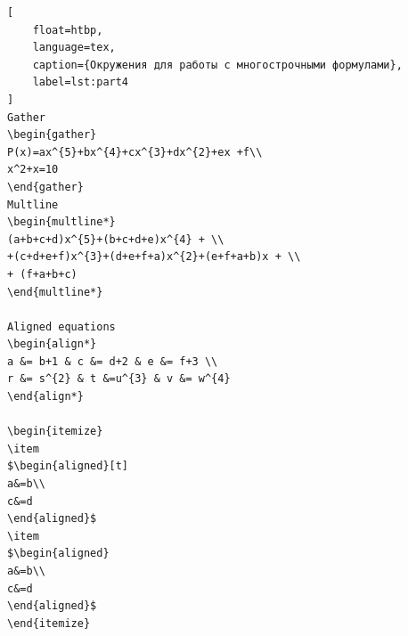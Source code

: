 \documentclass[a4paper, 12pt]{article}
\begin{document}
\begin{lstlisting}[
    float=htbp, 
    language=tex,
    caption={Окружения для работы с многострочными формулами}, 
    label=lst:part4
]
Gather
\begin{gather}
P(x)=ax^{5}+bx^{4}+cx^{3}+dx^{2}+ex +f\\
x^2+x=10
\end{gather}
Multline
\begin{multline*}
(a+b+c+d)x^{5}+(b+c+d+e)x^{4} + \\
+(c+d+e+f)x^{3}+(d+e+f+a)x^{2}+(e+f+a+b)x + \\
+ (f+a+b+c)
\end{multline*}

Aligned equations
\begin{align*}
a &= b+1 & c &= d+2 & e &= f+3 \\
r &= s^{2} & t &=u^{3} & v &= w^{4}
\end{align*}

\begin{itemize}
\item
$\begin{aligned}[t]
a&=b\\
c&=d
\end{aligned}$
\item
$\begin{aligned}
a&=b\\
c&=d
\end{aligned}$
\end{itemize}
\end{lstlisting}
\end{document}
